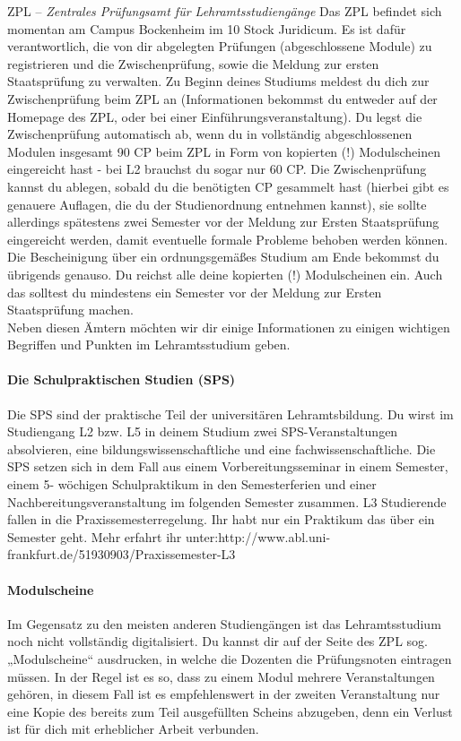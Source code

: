 ZPL – \textit{Zentrales Prüfungsamt für Lehramtsstudiengänge}
Das ZPL befindet sich momentan am Campus Bockenheim im 10 Stock Juridicum. Es ist dafür verantwortlich, die von dir abgelegten Prüfungen (abgeschlossene Module) zu registrieren und die Zwischenprüfung, sowie die Meldung zur ersten Staatsprüfung zu verwalten.
Zu Beginn deines Studiums meldest du dich zur Zwischenprüfung beim ZPL an (Informationen bekommst du entweder auf der Homepage des ZPL, oder bei einer Einführungsveranstaltung). Du legst die Zwischenprüfung automatisch ab, wenn du in vollständig abgeschlossenen Modulen insgesamt 90 CP beim ZPL in Form von kopierten (!) Modulscheinen eingereicht hast - bei L2 brauchst du sogar nur 60 CP.
Die Zwischenprüfung kannst du ablegen, sobald du die benötigten CP gesammelt hast (hierbei gibt es genauere Auflagen, die du der Studienordnung entnehmen kannst), sie sollte allerdings spätestens zwei Semester vor der Meldung zur Ersten Staatsprüfung eingereicht werden, damit eventuelle formale Probleme behoben werden können.
Die Bescheinigung über ein ordnungsgemäßes Studium am Ende bekommst du übrigends genauso. Du reichst alle deine kopierten (!) Modulscheinen ein. Auch das solltest du mindestens ein Semester vor der Meldung zur Ersten Staatsprüfung machen.\\

Neben diesen Ämtern möchten wir dir einige Informationen zu einigen wichtigen Begriffen und Punkten im Lehramtsstudium geben.

\paragraph{Die Schulpraktischen Studien (SPS)}
Die SPS sind der praktische Teil der universitären Lehramtsbildung. Du wirst im Studiengang L2 bzw. L5 in deinem Studium zwei SPS-Veranstaltungen absolvieren, eine bildungswissenschaftliche und eine fachwissenschaftliche. Die SPS setzen sich in dem Fall aus einem Vorbereitungsseminar in einem Semester, einem 5- wöchigen Schulpraktikum in den Semesterferien und einer Nachbereitungsveranstaltung im folgenden Semester zusammen.
L3 Studierende fallen in die Praxissemesterregelung. Ihr habt nur ein Praktikum das über ein Semester geht. Mehr erfahrt ihr unter:http://www.abl.uni-frankfurt.de/51930903/Praxissemester-L3

\paragraph{Modulscheine}
Im Gegensatz zu den meisten anderen Studiengängen ist das Lehramtsstudium noch nicht vollständig digitalisiert. Du kannst dir auf der Seite des ZPL sog. „Modulscheine“ ausdrucken, in welche die Dozenten die Prüfungsnoten eintragen müssen.
In der Regel ist es so, dass zu einem Modul mehrere Veranstaltungen gehören, in diesem Fall ist es empfehlenswert in der zweiten Veranstaltung nur eine Kopie des bereits zum Teil ausgefüllten Scheins abzugeben, denn ein Verlust ist für dich mit erheblicher Arbeit verbunden.

